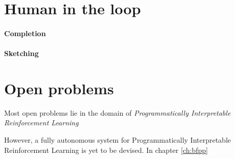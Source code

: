 \section{Human in the loop}

\paragraph{Completion}

\paragraph{Sketching}

\section{Open problems}

Most open problems lie in the domain of \emph{Programmatically Interpretable Reinforcement Learning}

However, a fully autonomous system for Programmatically Interpretable Reinforcement Learning is yet to be devised. In chapter \ref{ch:bfpp}